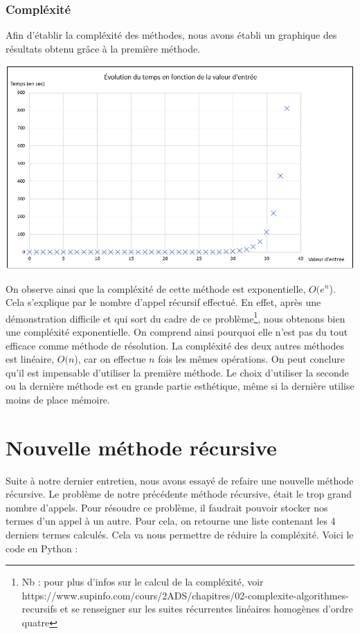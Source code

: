 \documentclass{article}
\newcommand{\code}[1]{}
\begin{document}
\section{Compléxité}

Afin d'établir la compléxité des méthodes, nous avons établi un graphique des résultats obtenu grâce à la première méthode.

\bigbreak
\begin{center}
\includegraphics[scale = 0.4]{Images/graphique.png}
\end{center}
\bigbreak

On observe ainsi que la compléxité de cette méthode est exponentielle, $ O(e^n$). Cela s'explique par le nombre d'appel récursif effectué. En effet, après une démonstration difficile et qui sort du cadre de ce problème\footnote{Nb : pour plus d'infos sur le calcul de la compléxité, voir https://www.supinfo.com/cours/2ADS/chapitres/02-complexite-algorithmes-recursifs et se renseigner sur les suites récurrentes linéaires homogènes d'ordre quatre}, nous obtenons bien une compléxité exponentielle.
On comprend ainsi pourquoi elle n'est pas du tout efficace comme méthode de résolution.
\bigbreak
La compléxité des deux autres méthodes est linéaire, $O(n$), car on effectue $n$ fois les mêmes opérations.
\bigbreak
On peut conclure qu'il est impensable d'utiliser la première méthode. Le choix d'utiliser la seconde ou la dernière méthode est en grande partie esthétique, même si la dernière utilise moins de place mémoire.
\bigbreak

\newpage
\part{Nouvelle méthode récursive}

Suite à notre dernier entretien, nous avons essayé de refaire une nouvelle méthode récursive. Le problème de notre précédente méthode récursive, était le trop grand nombre d'appels. Pour résoudre ce problème, il faudrait pouvoir stocker nos termes d'un appel à un autre. Pour cela, on retourne une liste contenant les 4 derniers termes calculés. Cela va nous permettre de réduire la compléxité. Voici le code en Python :
\bigbreak
\code{Algos/Problem117_4.py}
\bigbreak
\end{document}
